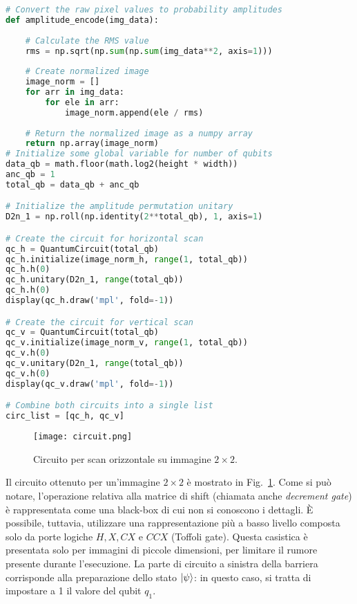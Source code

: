 \begin{lstlisting}[language=Python, 
    caption={Codice Python per creazione dei circuiti.}, label=cod:circuit]
# Convert the raw pixel values to probability amplitudes
def amplitude_encode(img_data):
    
    # Calculate the RMS value
    rms = np.sqrt(np.sum(np.sum(img_data**2, axis=1)))
    
    # Create normalized image
    image_norm = []
    for arr in img_data:
        for ele in arr:
            image_norm.append(ele / rms)
        
    # Return the normalized image as a numpy array
    return np.array(image_norm)
# Initialize some global variable for number of qubits
data_qb = math.floor(math.log2(height * width))
anc_qb = 1
total_qb = data_qb + anc_qb

# Initialize the amplitude permutation unitary
D2n_1 = np.roll(np.identity(2**total_qb), 1, axis=1)

# Create the circuit for horizontal scan
qc_h = QuantumCircuit(total_qb)
qc_h.initialize(image_norm_h, range(1, total_qb))
qc_h.h(0)
qc_h.unitary(D2n_1, range(total_qb))
qc_h.h(0)
display(qc_h.draw('mpl', fold=-1))

# Create the circuit for vertical scan
qc_v = QuantumCircuit(total_qb)
qc_v.initialize(image_norm_v, range(1, total_qb))
qc_v.h(0)
qc_v.unitary(D2n_1, range(total_qb))
qc_v.h(0)
display(qc_v.draw('mpl', fold=-1))

# Combine both circuits into a single list
circ_list = [qc_h, qc_v]
\end{lstlisting} 

\begin{figure}[ht]
    \texttt{[image: circuit.png]}
    \caption{Circuito per scan orizzontale su immagine $2 \times 2$.}
    \label{fig:circuit}
\end{figure}

Il circuito ottenuto per un'immagine $2 \times 2$ è mostrato in Fig.~\ref{fig:circuit}.
Come si può notare, l'operazione relativa alla matrice di shift (chiamata anche
\emph{decrement gate}) è 
rappresentata come una black-box di cui non si conoscono i dettagli.
È possibile, tuttavia, utilizzare una rappresentazione più a basso livello 
composta solo da porte logiche $H, X, CX$ e $CCX$ (Toffoli gate).
Questa casistica è presentata solo per immagini di piccole dimensioni, per limitare il 
rumore presente durante l'esecuzione. La parte di circuito a sinistra della barriera
corrisponde alla preparazione dello stato $\lvert\psi\rangle$: in questo caso, si tratta 
di impostare a 1 il valore del qubit $q_1$.

